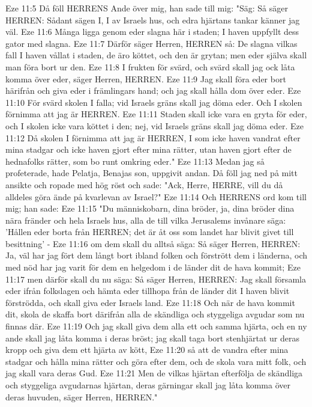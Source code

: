 Eze 11:5  Då föll HERRENS Ande över mig, han sade till mig: "Säg: Så säger HERREN: Sådant sägen I, I av Israels hus, och edra hjärtans tankar känner jag väl.
Eze 11:6  Många ligga genom eder slagna här i staden; I haven uppfyllt dess gator med slagna.
Eze 11:7  Därför säger Herren, HERREN så: De slagna vilkas fall I haven vållat i staden, de äro köttet, och den är grytan; men eder själva skall man föra bort ur den.
Eze 11:8  I frukten för svärd, och svärd skall jag ock låta komma över eder, säger Herren, HERREN.
Eze 11:9  Jag skall föra eder bort härifrån och giva eder i främlingars hand; och jag skall hålla dom över eder.
Eze 11:10  För svärd skolen I falla; vid Israels gräns skall jag döma eder. Och I skolen förnimma att jag är HERREN.
Eze 11:11  Staden skall icke vara en gryta för eder, och I skolen icke vara köttet i den; nej, vid Israels gräns skall jag döma eder.
Eze 11:12  Då skolen I förnimma att jag är HERREN, I som icke haven vandrat efter mina stadgar och icke haven gjort efter mina rätter, utan haven gjort efter de hednafolks rätter, som bo runt omkring eder."
Eze 11:13  Medan jag så profeterade, hade Pelatja, Benajas son, uppgivit andan. Då föll jag ned på mitt ansikte och ropade med hög röst och sade: "Ack, Herre, HERRE, vill du då alldeles göra ände på kvarlevan av Israel?"
Eze 11:14  Och HERRENS ord kom till mig; han sade:
Eze 11:15  "Du människobarn, dina bröder, ja, dina bröder dina nära fränder och hela Israels hus, alla de till vilka Jerusalems invånare säga: 'Hållen eder borta från HERREN; det är åt oss som landet har blivit givet till besittning' -
Eze 11:16  om dem skall du alltså säga: Så säger Herren, HERREN: Ja, väl har jag fört dem långt bort ibland folken och förstrött dem i länderna, och med nöd har jag varit för dem en helgedom i de länder dit de hava kommit;
Eze 11:17  men därför skall du nu säga: Så säger Herren, HERREN: Jag skall församla eder ifrån folkslagen och hämta eder tillhopa från de länder dit I haven blivit förströdda, och skall giva eder Israels land.
Eze 11:18  Och när de hava kommit dit, skola de skaffa bort därifrån alla de skändliga och styggeliga avgudar som nu finnas där.
Eze 11:19  Och jag skall giva dem alla ett och samma hjärta, och en ny ande skall jag låta komma i deras bröst; jag skall taga bort stenhjärtat ur deras kropp och giva dem ett hjärta av kött,
Eze 11:20  så att de vandra efter mina stadgar och hålla mina rätter och göra efter dem, och de skola vara mitt folk, och jag skall vara deras Gud.
Eze 11:21  Men de vilkas hjärtan efterfölja de skändliga och styggeliga avgudarnas hjärtan, deras gärningar skall jag låta komma över deras huvuden, säger Herren, HERREN."
